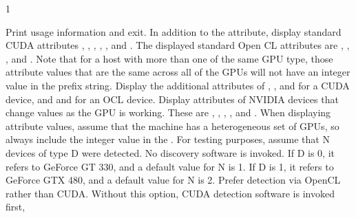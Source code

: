 \begin{ManPage}{\label{man-condor-gpu-discovery}}{1}
\begin{Options}
   {
    Print usage information and exit.
  }
   {
    In addition to the  attribute, display 
    standard CUDA attributes 
    , , , 
    , , and .
    The displayed standard Open CL attributes are
    , , , and
    .
    Note that for a host with more than one of the same GPU type,
    those attribute values that are the same across all of the GPUs
    will not have an integer value in the prefix string.
  }
   {
    Display the additional attributes of
    , , and 
    for a CUDA device,
    and
     and  for an OCL device.
  }
   {
    Display attributes of NVIDIA devices that change values as the GPU 
    is working.
    These are , , , 
    , and .
  }
   {
    When displaying attribute values, assume that the machine has a
    heterogeneous set of GPUs,
    so always include the integer value in the .
  }
   {
    For testing purposes, assume that N devices of type D were detected.
    No discovery software is invoked.
    If D is 0, it refers to GeForce GT 330, and a default value for N is 1.
    If D is 1, it refers to GeForce GTX 480, and a default value for N is 2.
  }
   {
    Prefer detection via OpenCL rather than CUDA.
    Without this option, CUDA detection software is invoked first,
}
\end{Options}
\end{ManPage}
